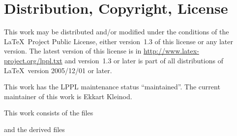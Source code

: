 \section{Distribution, Copyright, License}



This work may be distributed and/or modified under the conditions of the \LaTeX\ Project Public License, either version~1.3 of this license or any later version.
The latest version of this license is in \url{http://www.latex-project.org/lppl.txt} and version~1.3 or later is part of all distributions of \LaTeX\ version 2005/12/01 or later.

This work has the LPPL maintenance status ``maintained''.
The current maintainer of this work is Ekkart Kleinod.

This work consists of the files



and the derived files




